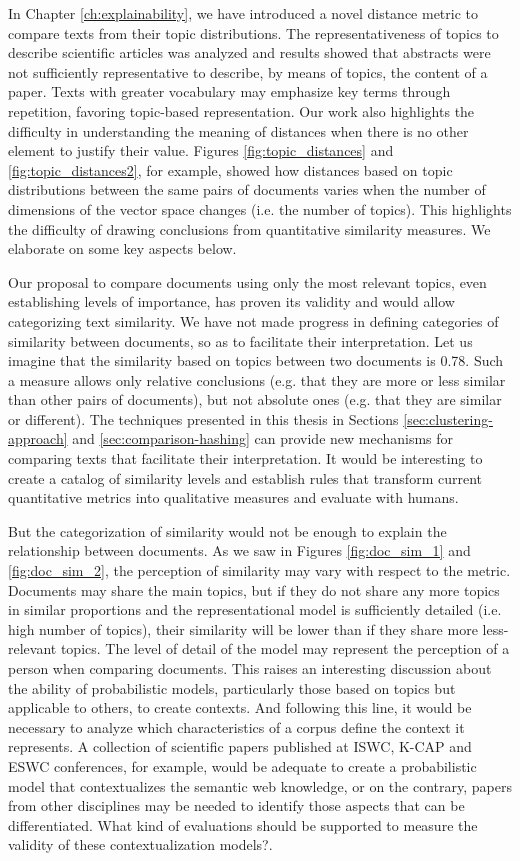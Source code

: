 In Chapter \ref{ch:explainability}, we have introduced a novel distance metric to compare texts from their topic distributions. The representativeness of topics to describe scientific articles was analyzed and results showed that abstracts were not sufficiently representative to describe, by means of topics, the content of a paper. Texts with greater vocabulary may emphasize key terms through repetition, favoring topic-based representation. Our work also highlights the difficulty in understanding the meaning of distances when there is no other element to justify their value. Figures \ref{fig:topic_distances} and \ref{fig:topic_distances2}, for example, showed how distances based on topic distributions between the same pairs of documents varies when the number of dimensions of the vector space changes (i.e. the number of topics). This highlights the difficulty of drawing conclusions from quantitative similarity measures. We elaborate on some key aspects below.

Our proposal to compare documents using only the most relevant topics, even establishing levels of importance, has proven its validity and would allow categorizing text similarity. We have not made progress in defining categories of similarity between documents, so as to facilitate their interpretation. Let us imagine that the similarity based on topics between two documents is 0.78. Such a measure allows only relative conclusions (e.g. that they are more or less similar than other pairs of documents), but not absolute ones (e.g. that they are similar or different). The techniques presented in this thesis in Sections \ref{sec:clustering-approach} and \ref{sec:comparison-hashing} can provide new mechanisms for comparing texts that facilitate their interpretation. It would be interesting to create a catalog of similarity levels and establish rules that transform current quantitative metrics into qualitative measures and evaluate with humans.
  
  
But the categorization of similarity would not be enough to explain the relationship between documents. As we saw in Figures \ref{fig:doc_sim_1} and \ref{fig:doc_sim_2}, the perception of similarity may vary with respect to the metric. Documents may share the main topics, but if they do not share any more topics in similar proportions and the representational model is sufficiently detailed (i.e. high number of topics), their similarity will be lower than if they share more less-relevant topics. The level of detail of the model may represent the perception of a person when comparing documents. This raises an interesting discussion about the ability of probabilistic models, particularly those based on topics but applicable to others, to create contexts. And following this line, it would be necessary to analyze which characteristics of a corpus define the context it represents. A collection of scientific papers published at ISWC, K-CAP and ESWC conferences, for example, would be adequate to create a probabilistic model that contextualizes the semantic web knowledge, or on the contrary, papers from other disciplines may be needed to identify those aspects that can be differentiated. What kind of evaluations should be supported to measure the validity of these contextualization models?.

